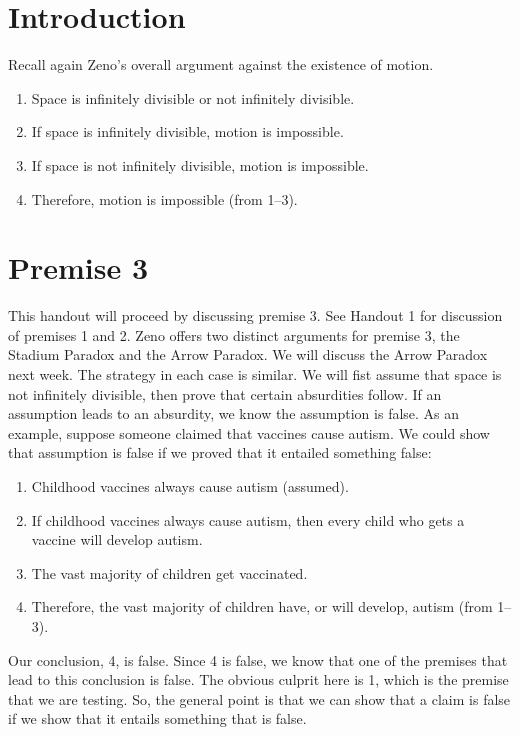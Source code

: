 \documentclass[oneside]{article}
\begin{document}
\thispagestyle{fancy}



\section{Introduction}

Recall again Zeno's overall argument against the existence of motion. 

\begin{enumerate}
\item Space is infinitely divisible or not infinitely divisible.
\item  If space is infinitely divisible, motion is impossible.
\item  If space is not infinitely divisible, motion is impossible.
\item  Therefore, motion is impossible (from 1--3).
\end{enumerate}

\section{Premise 3}\label{premise-3}

This handout will proceed by discussing premise 3. See Handout 1 for discussion of premises 1 and 2. Zeno offers two distinct arguments for premise 3, the Stadium Paradox and the Arrow Paradox. We will discuss the Arrow Paradox next week.  The strategy in each case is similar. We will fist assume that space is not infinitely divisible, then prove that certain absurdities follow. If an assumption leads to an absurdity, we know the assumption is false. As an example, suppose someone claimed that vaccines cause autism. We could show that assumption is false if we proved that it entailed something false: 

\begin{enumerate}
\item  Childhood vaccines always cause autism (assumed). 
\item If childhood vaccines always cause autism, then every child who gets a vaccine will develop autism. 
\item The vast majority of children get vaccinated. 
\item Therefore, the vast majority of children have, or will develop, autism (from 1--3). 
\end{enumerate}
Our conclusion, 4, is false. Since 4 is false, we know that one of the premises that lead to this conclusion is false. The obvious culprit here is 1, which is the premise that we are testing. So, the general point is that we can show that a claim is false if we show that it entails something that is  false. 
\end{document}
